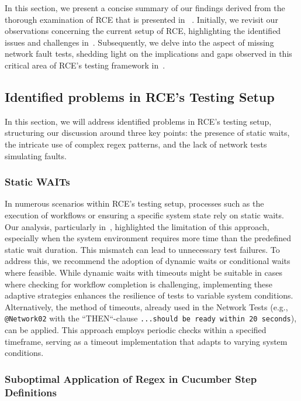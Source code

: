 In this section, we present a concise summary of our findings derived from the thorough examination of \ac{RCE} that is presented in ~. Initially, we revisit our observations concerning the current setup of RCE, highlighting the identified issues and challenges in~. Subsequently, we delve into the aspect of missing network fault tests, shedding light on the implications and gaps observed in this critical area of RCE's testing framework in~. 

\subsection{Identified problems in RCE's Testing Setup}
\label{sub:identified-problems}
In this section, we will address identified problems in RCE's testing setup, structuring our discussion around three key points: the presence of static waits, the intricate use of complex regex patterns, and the lack of network tests simulating faults.

\subsubsection{Static WAITs}
In numerous scenarios within \ac{RCE}'s testing setup, processes such as the execution of workflows or ensuring a specific system state rely on static waits. Our analysis, particularly in~, highlighted the limitation of this approach, especially when the system environment requires more time than the predefined static wait duration. This mismatch can lead to unnecessary test failures. To address this, we recommend the adoption of dynamic waits or conditional waits where feasible. While dynamic waits with timeouts might be suitable in cases where checking for workflow completion is challenging, implementing these adaptive strategies enhances the resilience of tests to variable system conditions. Alternatively, the method of timeouts, already used in the Network Tests (e.g., \verb|@Network02| with the ``THEN``-clause \verb|...should be ready within 20 seconds|), can be applied. This approach employs periodic checks within a specified timeframe, serving as a timeout implementation that adapts to varying system conditions.


\subsubsection{Suboptimal Application of Regex in Cucumber Step Definitions}
\label{subsec:resultCucumber}

